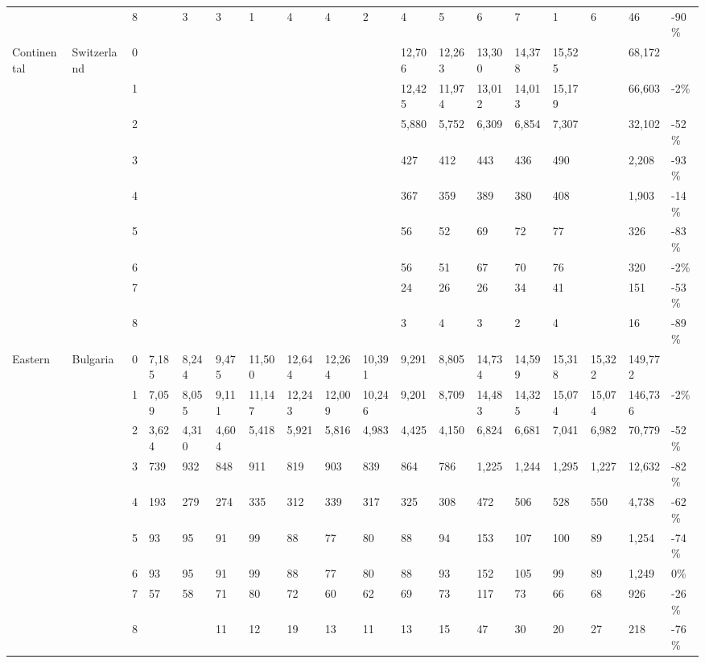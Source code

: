\begin{longtable}{llllllllllllllllll}
   &  & 8 &  & 3 & 3 & 1 & 4 & 4 & 2 & 4 & 5 & 6 & 7 & 1 & 6 & 46 & -90\% \\ 
  Continental & Switzerland & 0 &  &  &  &  &  &  &  & 12,706 & 12,263 & 13,300 & 14,378 & 15,525 &  & 68,172 &  \\ 
   &  & 1 &  &  &  &  &  &  &  & 12,425 & 11,974 & 13,012 & 14,013 & 15,179 &  & 66,603 & -2\% \\ 
   &  & 2 &  &  &  &  &  &  &  & 5,880 & 5,752 & 6,309 & 6,854 & 7,307 &  & 32,102 & -52\% \\ 
   &  & 3 &  &  &  &  &  &  &  & 427 & 412 & 443 & 436 & 490 &  & 2,208 & -93\% \\ 
   &  & 4 &  &  &  &  &  &  &  & 367 & 359 & 389 & 380 & 408 &  & 1,903 & -14\% \\ 
   &  & 5 &  &  &  &  &  &  &  & 56 & 52 & 69 & 72 & 77 &  & 326 & -83\% \\ 
   &  & 6 &  &  &  &  &  &  &  & 56 & 51 & 67 & 70 & 76 &  & 320 & -2\% \\ 
   &  & 7 &  &  &  &  &  &  &  & 24 & 26 & 26 & 34 & 41 &  & 151 & -53\% \\ 
   &  & 8 &  &  &  &  &  &  &  & 3 & 4 & 3 & 2 & 4 &  & 16 & -89\% \\ 
  Eastern & Bulgaria & 0 & 7,185 & 8,244 & 9,475 & 11,500 & 12,644 & 12,264 & 10,391 & 9,291 & 8,805 & 14,734 & 14,599 & 15,318 & 15,322 & 149,772 &  \\ 
   &  & 1 & 7,059 & 8,055 & 9,111 & 11,147 & 12,243 & 12,009 & 10,246 & 9,201 & 8,709 & 14,483 & 14,325 & 15,074 & 15,074 & 146,736 & -2\% \\ 
   &  & 2 & 3,624 & 4,310 & 4,604 & 5,418 & 5,921 & 5,816 & 4,983 & 4,425 & 4,150 & 6,824 & 6,681 & 7,041 & 6,982 & 70,779 & -52\% \\ 
   &  & 3 & 739 & 932 & 848 & 911 & 819 & 903 & 839 & 864 & 786 & 1,225 & 1,244 & 1,295 & 1,227 & 12,632 & -82\% \\ 
   &  & 4 & 193 & 279 & 274 & 335 & 312 & 339 & 317 & 325 & 308 & 472 & 506 & 528 & 550 & 4,738 & -62\% \\ 
   &  & 5 & 93 & 95 & 91 & 99 & 88 & 77 & 80 & 88 & 94 & 153 & 107 & 100 & 89 & 1,254 & -74\% \\ 
   &  & 6 & 93 & 95 & 91 & 99 & 88 & 77 & 80 & 88 & 93 & 152 & 105 & 99 & 89 & 1,249 & 0\% \\ 
   &  & 7 & 57 & 58 & 71 & 80 & 72 & 60 & 62 & 69 & 73 & 117 & 73 & 66 & 68 & 926 & -26\% \\ 
   &  & 8 &  &  & 11 & 12 & 19 & 13 & 11 & 13 & 15 & 47 & 30 & 20 & 27 & 218 & -76\% \\ 

\end{longtable}
